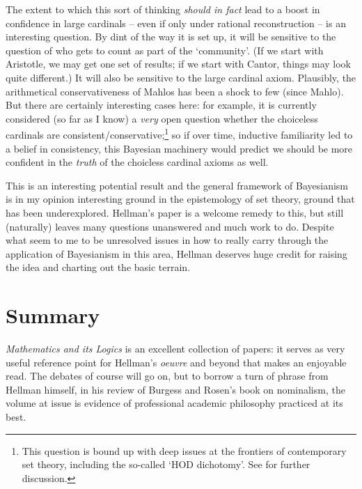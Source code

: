 \documentclass{amsart}
\theoremstyle{definition}
\begin{document}
The extent to which this sort of thinking \emph{should in fact} lead to a boost 
in confidence in large cardinals -- even if only under rational reconstruction --
is an interesting question. By dint of the way it is set up, it will be sensitive to 
the question of who gets to count as part of the `community'. (If we start with 
Aristotle, we may get one set of results; 
if we start with Cantor, things may look quite different.) It will also 
be sensitive to the large cardinal axiom. Plausibly, the arithmetical conservativeness of 
Mahlos has been a shock to few (since Mahlo). But there are certainly 
interesting cases here: for example, it is currently considered (so far as I 
know) a \emph{very} open question whether the choiceless cardinals 
are consistent/conservative;\footnote{
    This question is bound up with deep issues at the frontiers of 
    contemporary set theory, including the so-called `HOD dichotomy'.
    See \cite{bagaria_koellner_woodin_2019} for further discussion.
} 
so if over time, inductive familiarity led to a belief in consistency, this Bayesian 
machinery would predict we should be more confident in the \emph{truth} of the 
choicless cardinal axioms as well. 

This is an interesting potential result and the general framework of 
Bayesianism is in my opinion interesting ground in the epistemology of set theory,
ground that has been underexplored. Hellman's paper is a welcome remedy to this,
but still (naturally) leaves many questions unanswered and much work to do. Despite 
what seem to me to be unresolved issues in how to really carry through the application
of Bayesianism in this area, Hellman deserves huge credit for raising the idea 
and charting out the basic terrain.

\section*{Summary}
\emph{Mathematics and its Logics} is an excellent collection of papers: it serves 
as very useful reference point for Hellman's \emph{oeuvre} and beyond that 
makes an enjoyable read. The debates of course will go on, but to borrow 
a turn of phrase from Hellman himself, in his review of Burgess and Rosen's 
book on nominalism, the volume at issue is evidence of professional academic
philosophy practiced at its best. 



%
\end{document}

